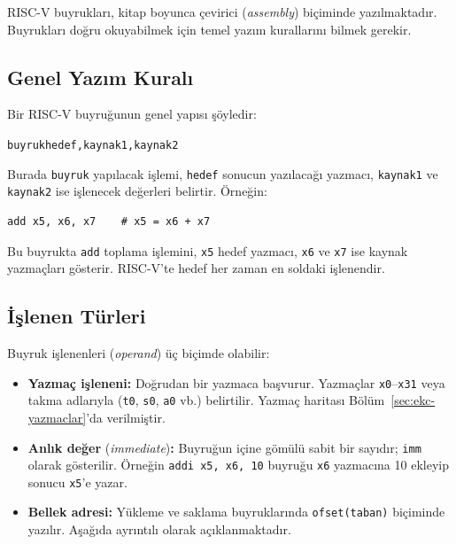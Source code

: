 RISC-V buyrukları, kitap boyunca çevirici (\emph{assembly}) biçiminde yazılmaktadır. Buyrukları doğru okuyabilmek için temel yazım kurallarını bilmek gerekir.

\subsection{Genel Yazım Kuralı}

Bir RISC-V buyruğunun genel yapısı şöyledir:

\begin{center}
\texttt{buyruk\quad hedef,\quad kaynak1,\quad kaynak2}
\end{center}

Burada \texttt{buyruk} yapılacak işlemi, \texttt{hedef} sonucun yazılacağı yazmacı, \texttt{kaynak1} ve \texttt{kaynak2} ise işlenecek değerleri belirtir. Örneğin:

\begin{lstlisting}[style=riscv, style=alistirma-kod]
add x5, x6, x7    # x5 = x6 + x7
\end{lstlisting}

Bu buyrukta \texttt{add} toplama işlemini, \texttt{x5} hedef yazmacı, \texttt{x6} ve \texttt{x7} ise kaynak yazmaçları gösterir. RISC-V'te hedef her zaman en soldaki işlenendir.

\subsection{İşlenen Türleri}

Buyruk işlenenleri (\emph{operand}) üç biçimde olabilir:

\begin{itemize}
    \item \textbf{Yazmaç işleneni:} Doğrudan bir yazmaca başvurur. Yazmaçlar \texttt{x0}--\texttt{x31} veya takma adlarıyla (\texttt{t0}, \texttt{s0}, \texttt{a0} vb.) belirtilir. Yazmaç haritası Bölüm~\ref{sec:ekc-yazmaclar}'da verilmiştir.
    \item \textbf{Anlık değer} (\emph{immediate})\textbf{:} Buyruğun içine gömülü sabit bir sayıdır; \texttt{imm} olarak gösterilir. Örneğin \texttt{addi x5, x6, 10} buyruğu \texttt{x6} yazmacına 10 ekleyip sonucu \texttt{x5}'e yazar.
    \item \textbf{Bellek adresi:} Yükleme ve saklama buyruklarında \texttt{ofset(taban)} biçiminde yazılır. Aşağıda ayrıntılı olarak açıklanmaktadır.
\end{itemize}

